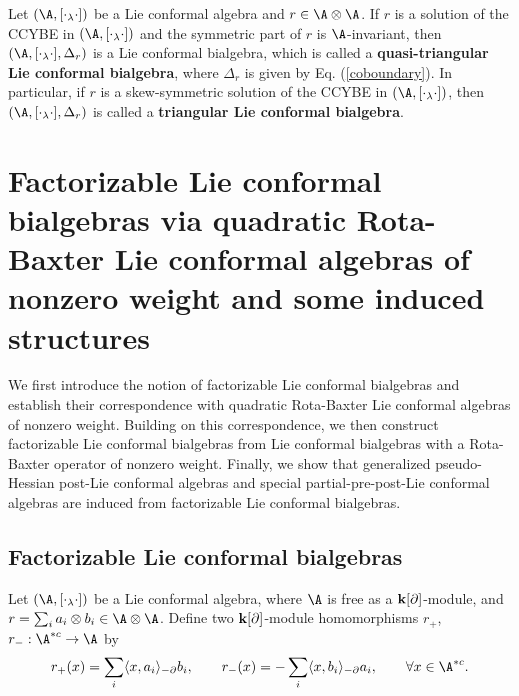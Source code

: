 \documentclass[12pt]{amsart}
\begin{document}
\begin{pdef}
    \cite{L} Let $(\A, [\cdot_\lambda \cdot])$ be a Lie conformal algebra and $r\in \A\otimes \A$. If $r$ is a solution of the CCYBE in $(\A, [\cdot_\lambda \cdot])$ and the
     symmetric part of $r$ is $\A$-invariant, then $(\A, [\cdot_\lambda\cdot], \Delta_r)$ is a Lie conformal bialgebra, which is called a {\bf quasi-triangular Lie conformal bialgebra},
     where $\Delta_r$ is given by Eq. (\ref{coboundary}). In particular, if $r$ is a skew-symmetric solution of the CCYBE in $(\A, [\cdot_\lambda \cdot])$, then $(\A, [\cdot_\lambda\cdot], \Delta_r)$ is called a {\bf triangular Lie conformal bialgebra}.

\end{pdef}




\section{Factorizable Lie conformal bialgebras via quadratic Rota-Baxter Lie conformal algebras of nonzero weight and some induced structures}\label{3}

We first introduce the notion of factorizable Lie conformal
bialgebras and establish their correspondence with quadratic
Rota-Baxter Lie conformal algebras of nonzero weight. Building on
this correspondence, we then construct factorizable Lie conformal
bialgebras from  Lie conformal bialgebras with a Rota-Baxter
operator of nonzero weight. Finally, we show that generalized
pseudo-Hessian post-Lie conformal algebras and special
partial-pre-post-Lie conformal algebras are induced from
factorizable Lie conformal bialgebras.

\subsection{Factorizable Lie conformal bialgebras}






    Let $(\A, [\cdot_\lambda \cdot])$ be a Lie conformal algebra, where $\A$ is free as a ${\bf k}[\partial]$-module, and $r=\sum_i a_i\otimes b_i\in \A\otimes \A$.    Define two ${\bf k}[\partial]$-module homomorphisms $r_+$, $r_-: \A^{*c}\rightarrow \A$ by
    \begin{equation}
\label{Eq-r}    r_+(x)=\sum_i \langle x,a_i\rangle_{-\partial} b_i,\qquad   r_-(x)=-\sum_i \langle x,b_i\rangle_{-\partial} a_i,\qquad \forall x\in \A^{*c}.
\end{equation}
\end{document}
